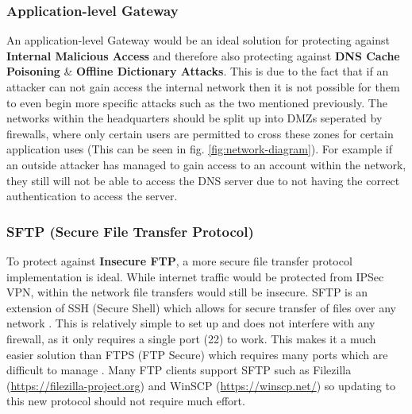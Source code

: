 \documentclass[11pt]{article}
\begin{document}
        \subsubsection{Application-level Gateway} \label{app-gateway}
          An application-level Gateway would be an ideal solution for protecting against \textbf{Internal Malicious Access} and therefore also protecting against \textbf{DNS Cache Poisoning} \& \textbf{Offline Dictionary Attacks}. This is due to the fact that if an attacker can not gain access the internal network then it is not possible for them to even begin more specific attacks such as the two mentioned previously. The networks within the headquarters should be split up into DMZs seperated by firewalls, where only certain users are permitted to cross these zones for certain application uses (This can be seen in fig. \ref{fig:network-diagram}). For example if an outside attacker has managed to gain access to an account within the network, they still will not be able to access the DNS server due to not having the correct authentication to access the server.

        \subsubsection{SFTP (Secure File Transfer Protocol)}
          To protect against \textbf{Insecure FTP}, a more secure file transfer protocol implementation is ideal. While internet traffic would be protected from IPSec VPN, within the network file transfers would still be insecure. SFTP is an extension of SSH (Secure Shell) which allows for secure transfer of files over any network \citep{sshSFTP}. This is relatively simple to set up and does not interfere with any firewall, as it only requires a single port (22) to work. This makes it a much easier solution than FTPS (FTP Secure) which requires many ports which are difficult to manage \citep{ga2011sftp}. Many FTP clients support SFTP such as Filezilla (\url{https://filezilla-project.org}) and WinSCP (\url{https://winscp.net/}) so updating to this new protocol should not require much effort.
\end{document}
